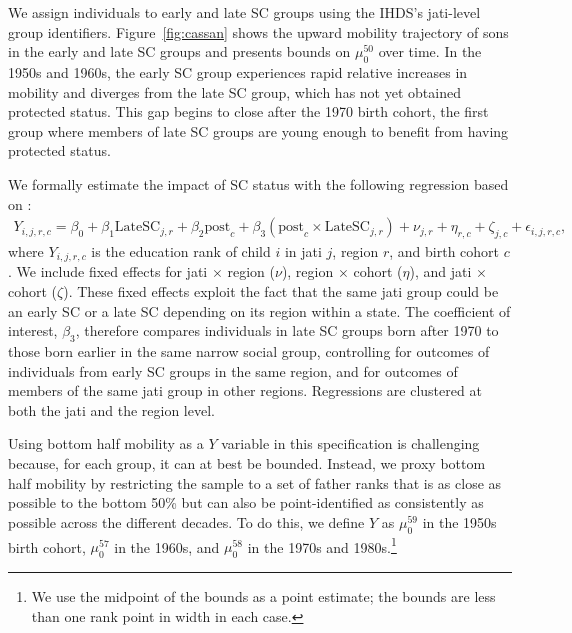 \documentclass[12pt,letterpaper]{article}
\numberwithin{equation}{section}
\begin{document}
We assign individuals to early and late SC groups using the IHDS's jati-level group identifiers. Figure~\ref{fig:cassan} shows the upward mobility trajectory of sons in the early and late SC groups and presents bounds on $\mu_0^{50}$ over time. In the 1950s and 1960s, the early SC group experiences rapid relative increases in mobility and diverges from the late SC group, which has not yet obtained protected status. This gap begins to close after the 1970 birth cohort, the first group where members of late SC groups are young enough to benefit from having protected status.

We formally estimate the impact of SC status with the following regression based on :
\begin{align}
  \label{eq:cassan}
  Y_{i,j,r,c} = \beta_0 + \beta_1 \text{LateSC}_{j,r} + \beta_2 \text{post}_{c} + \beta_3 \left( \text{post}_{c} \times \text{LateSC}_{j,r} \right) + \nu_{j,r} + \eta_{r,c} + \zeta_{j,c} + \epsilon_{i,j,r,c}\text{,}
\end{align}
\noindent where $Y_{i,j,r,c}$ is the education rank of child $i$ in jati $j$, region $r$, and birth cohort $c$. We include fixed effects for jati $ \times $ region ($\nu$), region $ \times $ cohort ($\eta$), and jati $ \times $ cohort ($\zeta$). These fixed effects exploit the fact that the same jati group could be an early SC or a late SC depending on its region within a state. The coefficient of interest, $\beta_3$, therefore compares individuals in late SC groups born after 1970 to those born earlier in the same narrow social group, controlling for outcomes of individuals from early SC groups in the same region, and for outcomes of members of the same jati group in other regions. Regressions are clustered at both the jati and the region level.

Using bottom half mobility as a $Y$ variable in this specification is challenging because, for each group, it can at best be bounded. Instead, we proxy bottom half mobility by restricting the sample to a set of father ranks that is as close as possible to the bottom 50\% but can also be point-identified as consistently as possible across the different decades. To do this, we define $Y$ as $\mu_0^{59}$ in the 1950s birth cohort, $\mu_0^{57}$ in the 1960s, and $\mu_0^{58}$ in the 1970s and 1980s.\footnote{We use the midpoint of the bounds as a point estimate; the bounds are less than one rank point in width in each case.}
\end{document}
